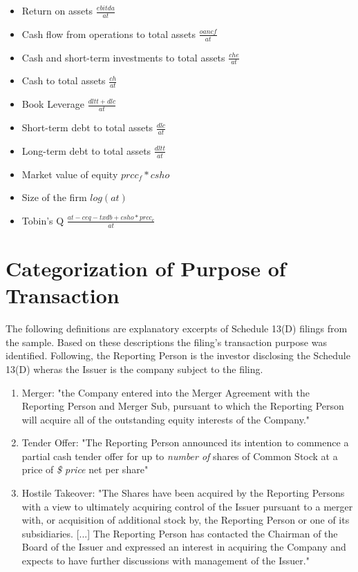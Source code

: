\documentclass[12pt]{article}
\begin{document}
\begin{appendices}
	\begin{itemize}
	\renewcommand\labelitemi{--}
		\item Return on assets $\frac{ebitda}{at}$
		\item Cash flow from operations to total assets $\frac{oancf}{at}$
		\item Cash and short-term investments to total assets $\frac{che}{at}$
		\item Cash to total assets $\frac{ch}{at}$
		\item Book Leverage \citep[p.1440]{MacKay2005} $\frac{dltt+dlc}{at}$
		\item Short-term debt to total assets $\frac{dlc}{at}$ 
		\item Long-term debt to total assets $\frac{dltt}{at}$
		\item Market value of equity $prcc_f*csho$
		\item Size of the firm $log(at)$
		\item Tobin's Q \citep[p.120]{Khatami2014} $\frac{at-ceq-txdb+csho*prcc_c}{at}$
	\end{itemize}


\section{Categorization of Purpose of Transaction}

\noindent The following definitions are explanatory excerpts of Schedule 13(D) filings from the sample. Based on these descriptions the filing's transaction purpose was identified. Following, the Reporting Person is the investor disclosing the Schedule 13(D) wheras the Issuer is the company subject to the filing. 
\begin{enumerate}
	

\item Merger: "the Company entered into the Merger Agreement with the Reporting Person and Merger Sub, pursuant to which the Reporting Person will acquire all of the outstanding equity interests of the Company."

\item Tender Offer: "The Reporting Person announced its intention to commence a partial cash tender offer for up to \emph{number of} shares of Common Stock at a price of \emph{\$ price} net per share"

\item Hostile Takeover: "The Shares have been acquired by the Reporting Persons with a view to ultimately acquiring  control of the Issuer  pursuant to a merger with, or  acquisition of additional  stock  by,  the Reporting Person  or one of its  subsidiaries. [...]
The Reporting Person has contacted the Chairman of the Board of the Issuer and expressed an interest in acquiring the Company and expects to have further discussions  with management of the Issuer."


\end{enumerate}
\end{appendices}
\end{document}
